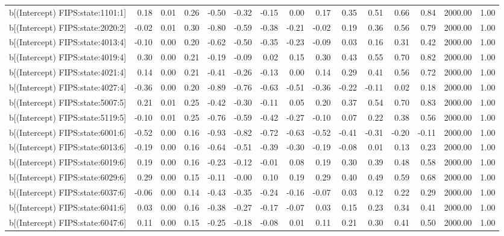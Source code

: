 \begin{table}[ht]
\begin{tabular}{rrrrrrrrrrrrrrr}
  b[(Intercept) FIPS:state:1101:1] & 0.18 & 0.01 & 0.26 & -0.50 & -0.32 & -0.15 & 0.00 & 0.17 & 0.35 & 0.51 & 0.66 & 0.84 & 2000.00 & 1.00 \\ 
  b[(Intercept) FIPS:state:2020:2] & -0.02 & 0.01 & 0.30 & -0.80 & -0.59 & -0.38 & -0.21 & -0.02 & 0.19 & 0.36 & 0.56 & 0.79 & 2000.00 & 1.00 \\ 
  b[(Intercept) FIPS:state:4013:4] & -0.10 & 0.00 & 0.20 & -0.62 & -0.50 & -0.35 & -0.23 & -0.09 & 0.03 & 0.16 & 0.31 & 0.42 & 2000.00 & 1.00 \\ 
  b[(Intercept) FIPS:state:4019:4] & 0.30 & 0.00 & 0.21 & -0.19 & -0.09 & 0.02 & 0.15 & 0.30 & 0.43 & 0.55 & 0.70 & 0.82 & 2000.00 & 1.00 \\ 
  b[(Intercept) FIPS:state:4021:4] & 0.14 & 0.00 & 0.21 & -0.41 & -0.26 & -0.13 & 0.00 & 0.14 & 0.29 & 0.41 & 0.56 & 0.72 & 2000.00 & 1.00 \\ 
  b[(Intercept) FIPS:state:4027:4] & -0.36 & 0.00 & 0.20 & -0.89 & -0.76 & -0.63 & -0.51 & -0.36 & -0.22 & -0.11 & 0.02 & 0.18 & 2000.00 & 1.00 \\ 
  b[(Intercept) FIPS:state:5007:5] & 0.21 & 0.01 & 0.25 & -0.42 & -0.30 & -0.11 & 0.05 & 0.20 & 0.37 & 0.54 & 0.70 & 0.83 & 2000.00 & 1.00 \\ 
  b[(Intercept) FIPS:state:5119:5] & -0.10 & 0.01 & 0.25 & -0.76 & -0.59 & -0.42 & -0.27 & -0.10 & 0.07 & 0.22 & 0.38 & 0.56 & 2000.00 & 1.00 \\ 
  b[(Intercept) FIPS:state:6001:6] & -0.52 & 0.00 & 0.16 & -0.93 & -0.82 & -0.72 & -0.63 & -0.52 & -0.41 & -0.31 & -0.20 & -0.11 & 2000.00 & 1.00 \\ 
  b[(Intercept) FIPS:state:6013:6] & -0.19 & 0.00 & 0.16 & -0.64 & -0.51 & -0.39 & -0.30 & -0.19 & -0.08 & 0.01 & 0.13 & 0.23 & 2000.00 & 1.00 \\ 
  b[(Intercept) FIPS:state:6019:6] & 0.19 & 0.00 & 0.16 & -0.23 & -0.12 & -0.01 & 0.08 & 0.19 & 0.30 & 0.39 & 0.48 & 0.58 & 2000.00 & 1.00 \\ 
  b[(Intercept) FIPS:state:6029:6] & 0.29 & 0.00 & 0.15 & -0.11 & -0.00 & 0.10 & 0.19 & 0.29 & 0.40 & 0.49 & 0.59 & 0.68 & 2000.00 & 1.00 \\ 
  b[(Intercept) FIPS:state:6037:6] & -0.06 & 0.00 & 0.14 & -0.43 & -0.35 & -0.24 & -0.16 & -0.07 & 0.03 & 0.12 & 0.22 & 0.29 & 2000.00 & 1.00 \\ 
  b[(Intercept) FIPS:state:6041:6] & 0.03 & 0.00 & 0.16 & -0.38 & -0.27 & -0.17 & -0.07 & 0.03 & 0.15 & 0.23 & 0.34 & 0.41 & 2000.00 & 1.00 \\ 
  b[(Intercept) FIPS:state:6047:6] & 0.11 & 0.00 & 0.15 & -0.25 & -0.18 & -0.08 & 0.01 & 0.11 & 0.21 & 0.30 & 0.41 & 0.50 & 2000.00 & 1.00 \\ 

\end{tabular}
\end{table}
